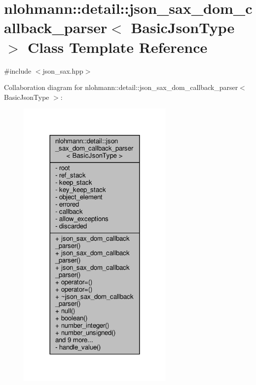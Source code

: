 \hypertarget{classnlohmann_1_1detail_1_1json__sax__dom__callback__parser}{}\section{nlohmann\+:\+:detail\+:\+:json\+\_\+sax\+\_\+dom\+\_\+callback\+\_\+parser$<$ Basic\+Json\+Type $>$ Class Template Reference}
\label{classnlohmann_1_1detail_1_1json__sax__dom__callback__parser}


{\ttfamily \#include $<$json\+\_\+sax.\+hpp$>$}



Collaboration diagram for nlohmann\+:\+:detail\+:\+:json\+\_\+sax\+\_\+dom\+\_\+callback\+\_\+parser$<$ Basic\+Json\+Type $>$\+:
\nopagebreak
\begin{figure}[H]
\begin{center}
\leavevmode
\includegraphics[width=216pt]{classnlohmann_1_1detail_1_1json__sax__dom__callback__parser__coll__graph}
\end{center}
\end{figure}
